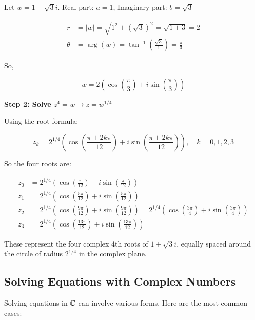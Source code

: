 Let \( w = 1 + \sqrt{3}i \). Real part: \( a = 1 \), Imaginary part: \( b = \sqrt{3} \)

\begin{align*}
	r      & = |w| = \sqrt{1^2 + {(\sqrt{3})}^2} = \sqrt{1 + 3} = 2                    \\
	\theta & = \arg(w) = \tan^{-1} \left( \frac{\sqrt{3}}{1} \right) = \frac{\pi}{3}
\end{align*}

So,

\[
	w = 2 \left( \cos\left( \frac{\pi}{3} \right) + i \sin\left( \frac{\pi}{3} \right) \right)
\]

\textbf{Step 2: Solve \( z^4 = w \to z = w^{1/4} \)}

Using the root formula:

\[
	z_k = 2^{1/4} \left( \cos\left( \frac{\pi + 2k\pi}{12} \right) + i \sin\left( \frac{\pi + 2k\pi}{12} 
	\right) \right), \quad k = 0, 1, 2, 3
\]

So the four roots are:

\begin{align*}
	z_0 & = 2^{1/4} \left( \cos\left( \frac{\pi}{12} \right) + i \sin\left( \frac{\pi}{12} \right) \right)                                                                                                    \\
	z_1 & = 2^{1/4} \left( \cos\left( \frac{5\pi}{12} \right) + i \sin\left( \frac{5\pi}{12} \right) \right)                                                                                                  \\
	z_2 & = 2^{1/4} \left( \cos\left( \frac{9\pi}{12} \right) + i \sin\left( \frac{9\pi}{12} \right) \right) = 2^{1/4} \left( \cos\left( \frac{3\pi}{4} \right) + i \sin\left( \frac{3\pi}{4} \right) \right) \\
	z_3 & = 2^{1/4} \left( \cos\left( \frac{13\pi}{12} \right) + i \sin\left( \frac{13\pi}{12} \right) \right)
\end{align*}

These represent the four complex 4th roots of \( 1 + \sqrt{3}i \), equally spaced around the circle of 
radius \( 2^{1/4} \) in the complex plane.

\subsection{Solving Equations with Complex Numbers}

Solving equations in \( \mathbb{C} \) can involve various forms. Here are the most common cases:

